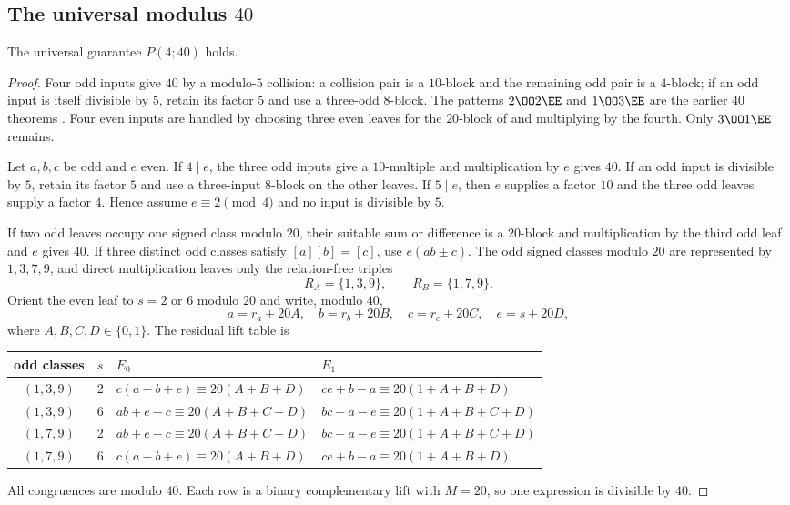 \subsection{\texorpdfstring{The universal modulus $40$}{The universal modulus 40}}\label{app:p40}

\begin{theorem}\label{thm:p40}
The universal guarantee $P(4;40)$ holds.
\end{theorem}
\begin{proof}
Four odd inputs give $40$ by a modulo-$5$ collision: a collision pair is a
$10$-block and the remaining odd pair is a $4$-block; if an odd input is
itself divisible by $5$, retain its factor $5$ and use a three-odd
$8$-block.  The patterns $2\OO2\EE$ and $1\OO3\EE$ are the earlier
$40$ theorems .  Four even inputs are handled
by choosing three even leaves for the $20$-block of
 and multiplying by the fourth.  Only $3\OO1\EE$
remains.

Let $a,b,c$ be odd and $e$ even.  If $4\mid e$, the three odd inputs give a
$10$-multiple and multiplication by $e$ gives $40$.  If an odd input is
divisible by $5$, retain its factor $5$ and use a three-input $8$-block on
the other leaves.  If $5\mid e$, then $e$ supplies a factor $10$ and the
three odd leaves supply a factor $4$.  Hence assume $e\equiv2\pmod4$ and no
input is divisible by $5$.

If two odd leaves occupy one signed class modulo $20$, their suitable sum or
difference is a $20$-block and multiplication by the third odd leaf and $e$
gives $40$.  If three distinct odd classes satisfy $[a][b]=[c]$, use
$e(ab\pm c)$.  The odd signed classes modulo $20$ are represented by
$1,3,7,9$, and direct multiplication leaves only the relation-free triples
\[
 R_A=\{1,3,9\},\qquad R_B=\{1,7,9\}.
\]
Orient the even leaf to $s=2$ or $6$ modulo $20$ and write, modulo $40$,
\[
 a=r_a+20A,\quad b=r_b+20B,\quad c=r_c+20C,
 \quad e=s+20D,
\]
where $A,B,C,D\in\{0,1\}$.  The residual lift table is
\small
\begin{center}
\begin{tabular}{@{}ccll@{}}
\toprule
odd classes & $s$ & $E_0$ & $E_1$ \\
\midrule
$(1,3,9)$&2&$c(a-b+e)\equiv20(A+B+D)$&$ce+b-a\equiv20(1+A+B+D)$\\
$(1,3,9)$&6&$ab+e-c\equiv20(A+B+C+D)$&$bc-a-e\equiv20(1+A+B+C+D)$\\
$(1,7,9)$&2&$ab+e-c\equiv20(A+B+C+D)$&$bc-a-e\equiv20(1+A+B+C+D)$\\
$(1,7,9)$&6&$c(a-b+e)\equiv20(A+B+D)$&$ce+b-a\equiv20(1+A+B+D)$\\
\bottomrule
\end{tabular}
\end{center}
\normalsize
All congruences are modulo $40$.  Each row is a binary complementary lift
with $M=20$, so one expression is divisible by $40$.
\end{proof}

